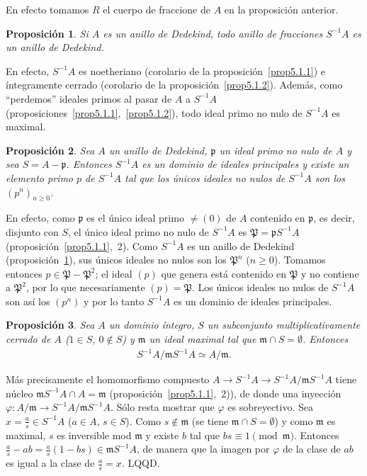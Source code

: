 \documentclass[bibtotoc,leqno,spanish]{amsbook}
\newcommand{\idl}[1]{\mathfrak{#1}}
\newcommand{\QED}{LQQD.}
\renewcommand{\to}[1][]{\xrightarrow{#1}}
\numberwithin{equation}{section}
\theoremstyle{note}
\theoremstyle{note}
\newtheorem{proposition}{Proposici\'on}
\theoremstyle{rem}
\numberwithin{theorem}{section}
\numberwithin{proposition}{section}
\numberwithin{definition}{section}
\numberwithin{lemma}{section}
\numberwithin{corollary}{section}
\numberwithin{example}{section}
\numberwithin{footnote}{section}%
\begin{document}
En efecto tomamos $R$ el cuerpo de fraccione de $A$ en la proposici\'on anterior.

\begin{proposition}\label{prop5.1.3}
Si $A$ es un anillo de Dedekind, todo anillo de fracciones $S^{-1}A$ es un anillo de Dedekind.
\end{proposition}

En efecto, $S^{-1}A$ es noetheriano (corolario de la proposici\'on~\ref{prop5.1.1})
e \'integramente cerrado (corolario de la proposici\'on~\ref{prop5.1.2}). Adem\'as,
como ``perdemos'' ideales primos al pasar de $A$ a $S^{-1}A$ (proposiciones~\ref{prop5.1.1},~\ref{prop5.1.2}), todo ideal primo no nulo de $S^{-1}A$
es maximal.

\begin{proposition}\label{prop5.1.4}
Sea $A$ un anillo de Dedekind, $\idl{p}$ un ideal primo no nulo de $A$ y sea $S = A-\idl{p}$. Entonces $S^{-1}A$
es un dominio de ideales principales y existe un elemento primo $p$ de $S^{-1}A$ tal que los \'unicos
ideales no nulos de $S^{-1}A$ son los $(p^{n})_{n\geq 0}$.
\end{proposition}

En efecto, como $\idl{p}$ es el \'unico ideal primo $\neq(0)$ de $A$ contenido en $\idl{p}$, es decir, disjunto con
$S$, el \'unico ideal primo no nulo de $S^{-1}A$ es $\idl{P}=\idl{p}S^{-1}A$
(proposici\'on~\ref{prop5.1.1},~2). Como $S^{-1}A$ es un
anillo de Dedekind (proposici\'on~\ref{prop5.1.3}), sus \'unicos ideales no nulos son los $\idl{P}^{n}$ ($n\geq 0$). Tomamos entonces
$p\in\idl{P}-\idl{P}^{2}$; el ideal $(p)$ que genera est\'a contenido en $\idl{P}$ y no contiene a $\idl{P}^{2}$,
por lo que necesariamente $(p) = \idl{P}$. Los \'unicos ideales no nulos de $S^{-1}A$ son as\'i los $(p^{n})$
y por lo tanto $S^{-1}A$ es un dominio de ideales principales.

\begin{proposition}\label{prop5.1.5}
Sea $A$ un dominio \'integro, $S$ un subconjunto multiplicativamente cerrado de $A$
{\upshape(}$1\in S$, $0\notin S${\upshape)} y $\idl{m}$ un ideal maximal tal que
$\idl{m}\cap S = \emptyset$. Entonces
\begin{gather*}
S^{-1}A/\idl{m}S^{-1}A\simeq A/\idl{m}.
\end{gather*}
\end{proposition}

M\'as precisamente el homomorfismo compuesto $A\to S^{-1}A\to S^{-1}A/\idl{m}S^{-1}A$ tiene n\'ucleo
$\idl{m}S^{-1}A\cap A=\idl{m}$ (proposici\'on~\ref{prop5.1.1},~2)),
de donde una inyecci\'on $\varphi:A/\idl{m}\to S^{-1}A/\idl{m}S^{-1}A$.
S\'olo resta mostrar que $\varphi$ es sobreyectivo. Sea $x = \frac{a}{s}\in S^{-1}A$ ($a\in A$, $s\in S$). Como
$s\notin\idl{m}$ (se tiene $\idl{m}\cap S=\emptyset$) y como $\idl{m}$ es maximal, $s$ es inversible mod $\idl{m}$
y existe $b$ tal que $bs\equiv 1\pmod\idl{m}$. Entonces $\frac{a}{s}-ab=\frac{a}{s}(1-bs)\in\idl{m}S^{-1}A$,
de manera que la imagen por $\varphi$ de la clase de $ab$ es igual a la clase de $\frac{a}{s} = x$. \QED
\end{document}
